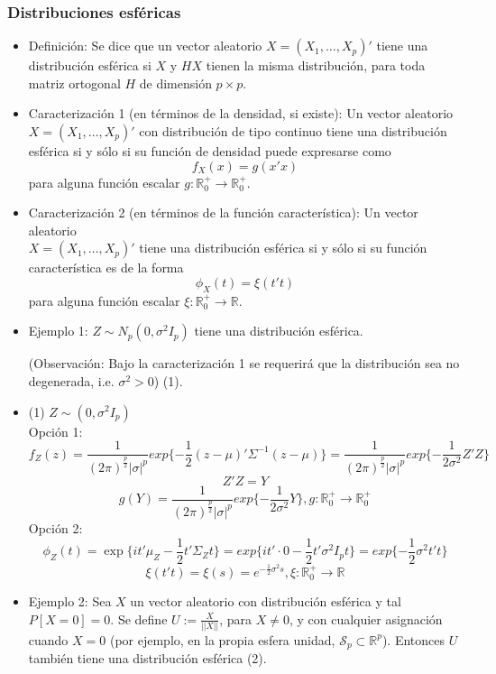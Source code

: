 \documentclass[11pt,a4paper]{article}
\begin{document}
\subsubsection{Distribuciones esféricas}
\begin{itemize}
\item Definición: Se dice que un vector aleatorio $X = (X_{1}, \dots, X_{p})'$ tiene una distribución esférica si $X$ y $HX$ tienen la misma distribución, para toda matriz ortogonal $H$ de dimensión $p \times p$.

\item Caracterización 1 (en términos de la densidad, si existe): Un vector aleatorio $X = (X_{1}, \dots, X_{p})'$ con distribución de tipo continuo tiene una distribución esférica si y sólo si su función de densidad puede expresarse como
$$f_{X}(x) = g(x'x)$$
para alguna función escalar $g: \mathbb{R}_{0}^{+} \to \mathbb{R}_{0}^{+}$.

\item Caracterización 2 (en términos de la función característica): Un vector aleatorio \\ $X = (X_{1}, \dots, X_{p})'$ tiene una distribución esférica si y sólo si su función característica es de la forma
$$\phi_{X}(t) = \xi(t't)$$
para alguna función escalar $\xi: \mathbb{R}^{+}_{0} \to \mathbb{R}$.

\item Ejemplo 1: $Z \sim N_{p}(0, \sigma^{2}I_{p})$ tiene una distribución esférica.

(Observación: Bajo la caracterización 1 se requerirá que la distribución sea no degenerada, i.e. $\sigma^{2} > 0$) (1).

\item (1) $Z \sim (0, \sigma^{2}I_{p})$ \\
Opción 1:
$$f_{Z}(z) = \frac{1}{(2\pi)^{\frac{p}{2}} |\sigma|^{p}} exp\{-\frac{1}{2}(z-\mu)'\Sigma^{-1}(z-\mu)\} = \frac{1}{(2\pi)^{\frac{p}{2}} |\sigma|^{p}} exp\{-\frac{1}{2\sigma^{2}}Z'Z\}$$
$$Z'Z = Y$$
$$g(Y) = \frac{1}{(2\pi)^{\frac{p}{2}} |\sigma|^{p}} exp\{-\frac{1}{2\sigma^{2}}Y\}, g: \mathbb{R}^{+}_{0} \to \mathbb{R}^{+}_{0}$$
Opción 2:
$$\phi_{Z}(t) = \exp\{it'\mu_{Z} - \frac{1}{2}t'\Sigma_{Z}t\} = exp\{it' \cdot 0 - \frac{1}{2}t'\sigma^{2}I_{p}t\} = exp\{-\frac{1}{2} \sigma^{2}t't\}$$
$$\xi(t't) = \xi(s) = e^{-\frac{1}{2}\sigma^{2}s}, \xi: \mathbb{R}^{+}_{0} \to \mathbb{R}$$

\item Ejemplo 2: Sea $X$ un vector aleatorio con distribución esférica y tal $P[X=0]=0$. Se define $U := \frac{X}{||X||}$, para $X \neq 0$, y con cualquier asignación cuando $X = 0$ (por ejemplo, en la propia esfera unidad, $\mathcal{S}_{p} \subset \mathbb{R}^{p}$). Entonces $U$ también tiene una distribución esférica (2).


\end{itemize}
\end{document}
